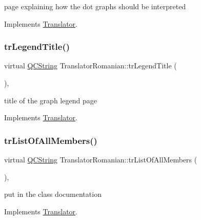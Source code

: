 page explaining how the dot graph\textquotesingle{}s should be interpreted 

Implements \mbox{\hyperlink{class_translator}{Translator}}.

\mbox{\label{class_translator_romanian_a3e9193e24ba2b5dfa17997bcb1f77408}} 
\subsubsection{\texorpdfstring{trLegendTitle()}{trLegendTitle()}}
{\footnotesize\ttfamily virtual \mbox{\hyperlink{class_q_c_string}{Q\+C\+String}} Translator\+Romanian\+::tr\+Legend\+Title (\begin{DoxyParamCaption}{ }\end{DoxyParamCaption})\hspace{0.3cm}{\ttfamily [inline]}, {\ttfamily [virtual]}}

title of the graph legend page 

Implements \mbox{\hyperlink{class_translator}{Translator}}.

\mbox{\label{class_translator_romanian_a46522fdec227d0aab72a49d156e752c4}} 
\subsubsection{\texorpdfstring{trListOfAllMembers()}{trListOfAllMembers()}}
{\footnotesize\ttfamily virtual \mbox{\hyperlink{class_q_c_string}{Q\+C\+String}} Translator\+Romanian\+::tr\+List\+Of\+All\+Members (\begin{DoxyParamCaption}{ }\end{DoxyParamCaption})\hspace{0.3cm}{\ttfamily [inline]}, {\ttfamily [virtual]}}

put in the class documentation 

Implements \mbox{\hyperlink{class_translator}{Translator}}.

\mbox{\label{class_translator_romanian_aca59b71b202e2de638829c093873dc93}} 
